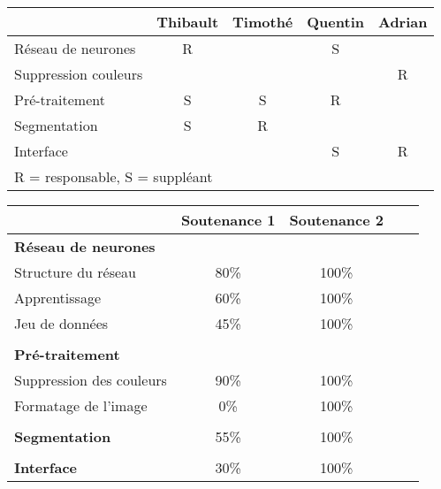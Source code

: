 \begin{center}
    \begin{tabular}{@{} l *4c @{}}
        \toprule
        \multicolumn{1}{c}{} &
            \textbf{Thibault} & \textbf{Timothé}  &
            \textbf{Quentin} & \textbf{Adrian} \\
        \midrule
        Réseau de neurones & R & & S & \\
        Suppression couleurs & & & & R \\
        Pré-traitement & S & S & R & \\
        Segmentation & S & R & & \\
        Interface & & & S & R \\
        \bottomrule
        \multicolumn{4}{l}{\footnotesize R = responsable, S = suppléant}\\
    \end{tabular}
\end{center}

\vspace{2em}

\begin{center}
    \begin{tabular}{@{} l *4c @{}}
        \toprule
        \multicolumn{1}{c}{} & \textbf{Soutenance 1}  & \textbf{Soutenance 2} \\
        \midrule
        \textbf{Réseau de neurones} \\
        Structure du réseau & 80\% & 100\% \\
        Apprentissage & 60\% & 100\% \\
        Jeu de données & 45\% & 100\% \\\\
        \textbf{Pré-traitement} \\
        Suppression des couleurs & 90\% & 100\% \\
        Formatage de l'image & 0\% & 100\% \\\\
        \textbf{Segmentation} & 55\% & 100\% \\\\
        \textbf{Interface} & 30\% & 100\% \\
        \bottomrule
    \end{tabular}
\end{center}
